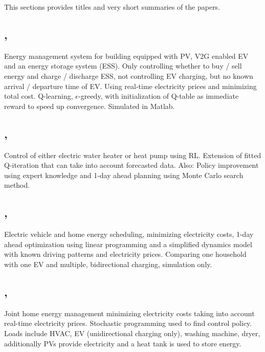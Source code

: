 \documentclass[a4paper]{article}
\begin{document}
\begin{multicols}{2}
	This sections provides titles and very short summaries of the papers.
	
	\subsection{, \cite{en11082010} }
	
	Energy management system for building equipped with PV,
	V2G enabled EV and an energy storage system (ESS). 
	Only controlling whether to buy / sell energy and charge / discharge
	ESS, not controlling EV charging, but no known arrival / departure time
	of EV. Using real-time electricity prices and minimizing total cost.
	Q-learning, $\epsilon$-greedy, with initialization of Q-table as 
	immediate reward to speed up convergence. Simulated in Matlab.
	
	\subsection{, \cite{7401112} }
	
	Control of either electric water heater or heat pump
	using RL. Extension of fitted Q-iteration that can take into account 
	forecasted data. Also: Policy improvement using expert knowledge
	and 1-day ahead planning using Monte Carlo search method.
	
	\subsection{, \cite{6596523} }
	
	Electric vehicle and home energy scheduling, minimizing
	electricity costs, 1-day ahead optimization using linear programming
	and a simplified dynamics model
	with known driving patterns and electricity prices.
	Comparing one household with one EV and multiple, 
	bidirectional charging, simulation only.
	
	\subsection{, \cite{6892986}}
	
	Joint home energy management minimizing electricity costs
	taking into account real-time electricity prices. Stochastic
	programming used to find control policy. Loads include HVAC, EV
	 (unidirectional charging only),
	washing machine, dryer, additionally PVs provide electricity
	and a heat tank is used to store energy. 
	

\end{multicols}
\end{document}
